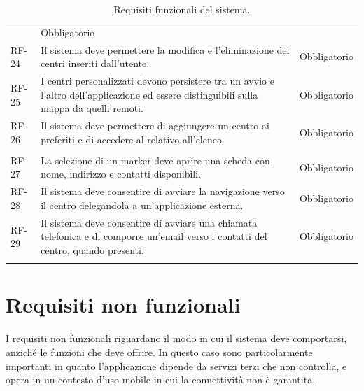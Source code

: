 \begin{longtable}{@{}P{1.4cm} P{9.1cm} P{2.3cm}@{}}
& Obbligatorio \tabularnewline
RF-24 & Il sistema deve permettere la modifica e l'eliminazione dei centri inseriti dall'utente.
& Obbligatorio \tabularnewline
RF-25 & I centri personalizzati devono persistere tra un avvio e l'altro dell'applicazione ed essere distinguibili sulla mappa da quelli remoti.
& Obbligatorio \tabularnewline
RF-26 & Il sistema deve permettere di aggiungere un centro ai preferiti e di accedere al relativo all'elenco.
& Obbligatorio \tabularnewline
\addlinespace
{} \tabularnewline
RF-27 & La selezione di un marker deve aprire una scheda con nome, indirizzo e contatti disponibili.
& Obbligatorio \tabularnewline
RF-28 & Il sistema deve consentire di avviare la navigazione verso il centro delegandola a un'applicazione esterna.
& Obbligatorio \tabularnewline
RF-29 & Il sistema deve consentire di avviare una chiamata telefonica e di comporre un'email verso i contatti del centro, quando presenti.
& Obbligatorio \tabularnewline
\addlinespace
\caption{Requisiti funzionali del sistema.}
\label{tab:requisiti-funzionali}
\end{longtable}
\normalsize

\section{Requisiti non funzionali}\label{sec:requisiti-non-funzionali}

I requisiti non funzionali riguardano il modo in cui il sistema deve comportarsi, anziché le funzioni che deve offrire.
In questo caso sono particolarmente importanti in quanto l'applicazione dipende da servizi terzi che non controlla, e
opera in un contesto d'uso mobile in cui la connettività non è garantita.


